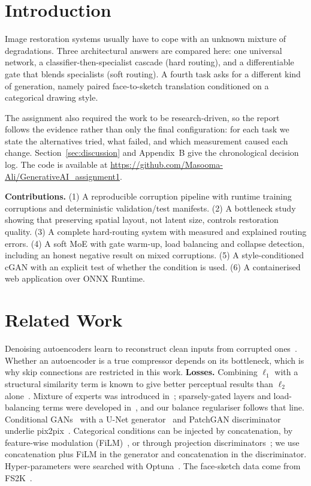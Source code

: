 \documentclass[conference]{IEEEtran}
\newcommand{\repourl}{https://github.com/Masooma-Ali/GenerativeAI_assignment1}
\begin{document}
\section{Introduction}
Image restoration systems usually have to cope with an unknown mixture of degradations. Three architectural answers are compared here: one universal network, a classifier-then-specialist cascade (hard routing), and a differentiable gate that blends specialists (soft routing). A fourth task asks for a different kind of generation, namely paired face-to-sketch translation conditioned on a categorical drawing style.

The assignment also required the work to be research-driven, so the report follows the evidence rather than only the final configuration: for each task we state the alternatives tried, what failed, and which measurement caused each change. Section~\ref{sec:discussion} and Appendix~B give the chronological decision log. The code is available at \url{\repourl}.

\textbf{Contributions.} (1) A reproducible corruption pipeline with runtime training corruptions and deterministic validation/test manifests. (2) A bottleneck study showing that preserving spatial layout, not latent size, controls restoration quality. (3) A complete hard-routing system with measured and explained routing errors. (4) A soft MoE with gate warm-up, load balancing and collapse detection, including an honest negative result on mixed corruptions. (5) A style-conditioned cGAN with an explicit test of whether the condition is used. (6) A containerised web application over ONNX Runtime.

\section{Related Work}
Denoising autoencoders learn to reconstruct clean inputs from corrupted ones~\cite{vincent2008}. Whether an autoencoder is a true compressor depends on its bottleneck, which is why skip connections are restricted in this work. \textbf{Losses.} Combining $\ell_1$ with a structural similarity term is known to give better perceptual results than $\ell_2$ alone~\cite{wang2004,zhao2017}. Mixture of experts was introduced in~\cite{jacobs1991}; sparsely-gated layers and load-balancing terms were developed in~\cite{shazeer2017,fedus2022}, and our balance regulariser follows that line. Conditional GANs~\cite{goodfellow2014,mirza2014} with a U-Net generator~\cite{ronneberger2015} and PatchGAN discriminator underlie pix2pix~\cite{isola2017}. Categorical conditions can be injected by concatenation, by feature-wise modulation (FiLM)~\cite{perez2018}, or through projection discriminators~\cite{miyato2018}; we use concatenation plus FiLM in the generator and concatenation in the discriminator. Hyper-parameters were searched with Optuna~\cite{akiba2019}. The face-sketch data come from FS2K~\cite{fan2022}.
\end{document}
